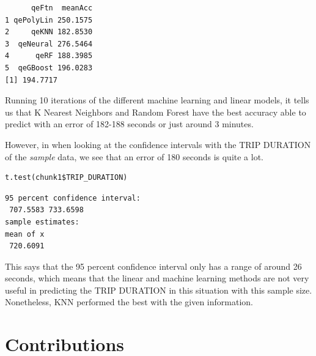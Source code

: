 \documentclass{article}
\numberwithin{equation}{section}
\begin{document}
\begin{verbatim}
      qeFtn  meanAcc
1 qePolyLin 250.1575
2     qeKNN 182.8530
3  qeNeural 276.5464
4      qeRF 188.3985
5  qeGBoost 196.0283
[1] 194.7717
\end{verbatim}

Running 10 iterations of the different machine learning and linear models, it tells us that K Nearest Neighbors and Random Forest have the best accuracy able to predict with an error of 182-188 seconds or just around 3 minutes.

However, in when looking at the confidence intervals with the TRIP DURATION of the \textit{sample} data, we see that an error of 180 seconds is quite a lot.
\begin{lstlisting}
t.test(chunk1$TRIP_DURATION)    
\end{lstlisting}
\begin{verbatim}
95 percent confidence interval:
 707.5583 733.6598
sample estimates:
mean of x 
 720.6091    
\end{verbatim}

This says that the 95 percent confidence interval only has a range of around 26 seconds, which means that the linear and machine learning methods are not very useful in predicting the TRIP DURATION in this situation with this sample size. Nonetheless, KNN performed the best with the given information.


\section{Contributions}
\end{document}
